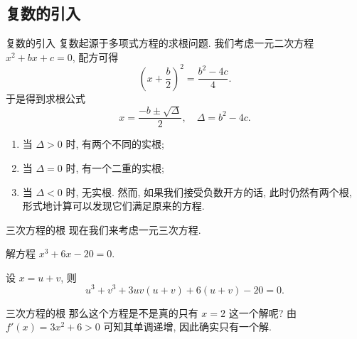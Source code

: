 \subsection{复数的引入}

\begin{frame}{复数的引入\noexer}
	\onslide<+->
	复数起源于多项式方程的求根问题.
	\onslide<+->
	我们考虑一元二次方程 $x^2+bx+c=0$,
	\onslide<+->
	配方可得
		\[\left(x+\frac b2\right)^2=\frac{b^2-4c}4.\]
	\onslide<+->
	于是得到求根公式
		\[x=\frac{-b\pm\sqrt\Delta}2,\quad \Delta=b^2-4c.\]
	\begin{enumerate}
		\item 当 $\Delta>0$ 时, 有两个不同的实根;
		\item 当 $\Delta=0$ 时, 有一个二重的实根;
		\item 当 $\Delta<0$ 时, 无实根.
		\onslide<+->
		然而, 如果我们\alert{接受负数开方}的话, 此时仍然有两个根, 形式地计算可以发现它们满足原来的方程.
	\end{enumerate}
\end{frame}


\begin{frame}{三次方程的根\noexer}
	\onslide<+->
	现在我们来考虑一元三次方程.
	\onslide<+->
	\begin{example}
		解方程 $x^3+6x-20=0$.
	\end{example}
	\onslide<+->
	\begin{solution}
		设 $x=u+v$, 则
			\[u^3+v^3+3uv(u+v)+6(u+v)-20=0.\]
		\onslide<+->{%
			$x=u+v=2$.
		}
	\end{solution}
\end{frame}


\begin{frame}{三次方程的根\noexer}
	\onslide<+->
	那么这个方程是不是真的只有 $x=2$ 这一个解呢?
	\onslide<+->
	由 $f'(x)=3x^2+6>0$ 可知其单调递增, 因此确实只有一个解.
	\begin{center}
	\end{center}
\end{frame}


